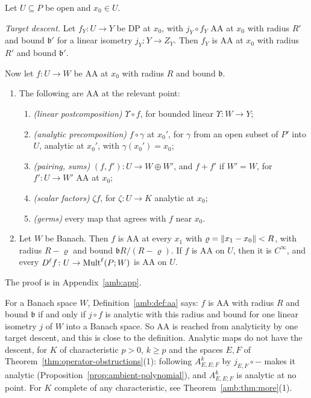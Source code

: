 \begin{proposition}\label{amb:prop:permanence}
Let $U\subseteq P$ be open and $x_0\in U$.

\emph{Target descent.} Let $f_Y\colon U\to Y$ be DP at $x_0$, with $j_Y\circ f_Y$ AA at $x_0$ with radius $R'$ and bound $\mathfrak b'$ for a linear isometry $j_Y\colon Y\to Z_Y$. Then $f_Y$ is AA at $x_0$ with radius $R'$ and bound $\mathfrak b'$.

Now let $f\colon U\to W$ be AA at $x_0$ with radius $R$ and bound $\mathfrak b$.
\begin{enumerate}
\item The following are AA at the relevant point:
\begin{enumerate}
\item \emph{(linear postcomposition)} $\Upsilon\circ f$, for bounded linear $\Upsilon\colon W\to Y$;
\item \emph{(analytic precomposition)} $f\circ\gamma$ at $x_0'$, for $\gamma$ from an open subset of $P'$ into $U$, analytic at $x_0'$, with $\gamma(x_0')=x_0$;
\item \emph{(pairing, sums)} $(f,f')\colon U\to W\oplus W'$, and $f+f'$ if $W'=W$, for $f'\colon U\to W'$ AA at $x_0$;
\item \emph{(scalar factors)} $\zeta f$, for $\zeta\colon U\to K$ analytic at $x_0$;
\item \emph{(germs)} every map that agrees with $f$ near $x_0$.
\end{enumerate}
\item Let $W$ be Banach. Then $f$ is AA at every $x_1$ with $\varrho=\lVert x_1-x_0\rVert<R$, with radius $R-\varrho$ and bound $\mathfrak bR/(R-\varrho)$. If $f$ is AA on $U$, then it is $C^\infty$, and every $D^\ell f\colon U\to\operatorname{Mult}^\ell(P;W)$ is AA on $U$.
\end{enumerate}
\end{proposition}

The proof is in Appendix~\ref{amb:app}.

\begin{remark}\label{amb:rem:descent}
For a Banach space $W$, Definition~\ref{amb:def:aa} says: $f$ is AA with radius $R$ and bound $\mathfrak b$ if and only if $j\circ f$ is analytic with this radius and bound for one linear isometry $j$ of $W$ into a Banach space. So AA is reached from analyticity by one target descent, and this is close to the definition. Analytic maps do not have the descent, for $K$ of characteristic $p>0$, $k\ge p$ and the spaces $E,F$ of Theorem~\ref{thm:operator-obstructions}(1): following $A^k_{E,E;F}$ by $j_{E,F}\circ{-}$ makes it analytic (Proposition~\ref{prop:ambient-polynomial}), and $A^k_{E,E;F}$ is analytic at no point. For $K$ complete of any characteristic, see Theorem~\ref{amb:thm:more}(1).
\end{remark}

